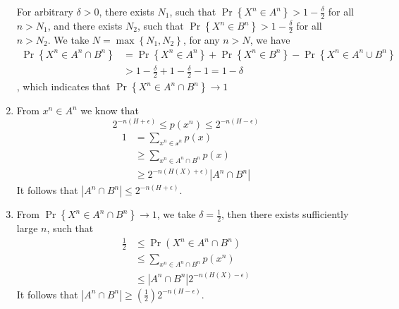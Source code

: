 \begin{exercise}[AEP]
\begin{solution}
\begin{enumerate}
{      For arbitrary $\delta > 0$, there exists $N_1$, such that  $\Pr \left\{X^n \in A^n \right\} > 1 - \frac{\delta}{2}$ for all $n>N_1$, and there exists $N_2$, such that  $\Pr \left\{X^n \in B^n \right\} > 1 - \frac{\delta}{2}$ for all $n>N_2$.
      We take $N = \max \left\{N_1,N_2\right\}$, for any $n>N$, we have
      \begin{equation}
        \begin{aligned}
          \Pr \left\{X^{n} \in A^{n} \cap B^{n}\right\} &= \Pr \left\{X^n \in A^n \right\} +  \Pr \left\{X^n \in B^n \right\} - \Pr \left\{X^n \in A^n \cup B^n \right\}\\
          & > 1 - \frac{\delta}{2} + 1 - \frac{\delta}{2} - 1 = 1 - \delta
        \end{aligned}
      \end{equation}
      , which indicates that $\Pr \left\{X^{n} \in A^{n} \cap B^{n}\right\} \rightarrow 1$
    }
    \item {
      From $x^n\in A^n$ we know that
      \begin{equation}
        2^{-n(H+\epsilon)} \le p(x^n) \le 2^{-n(H-\epsilon)}
      \end{equation}
      \begin{equation}
        \begin{aligned}
          1 &= \sum_{x^n\in \mathcal{x}^n} p(x) \\
          &\ge \sum_{x^n\in A^n \cap B^n} p(x) \\
          &\ge 2^{-n(H(X)+\epsilon)} |A^n\cap B^n|
        \end{aligned}
      \end{equation}
      It follows that $\left|A^{n} \cap B^{n}\right| \leq 2^{-n(H+\epsilon)}$.
    }
    \item {
      From $\Pr \left\{X^n \in A^n \cap B^n \right\} \rightarrow 1$, we take $\delta = \frac{1}{2}$, then there exists sufficiently large $n$, such that
      \begin{equation}
        \begin{aligned}
          \frac{1}{2} &\le \Pr (X^n \in A^n \cap B^n) \\
          &\le \sum_{x^n \in A^n \cap B^n} p(x^n) \\
          &\le |A^n\cap B^n| 2^{-n(H(X)-\epsilon)}
        \end{aligned}
      \end{equation}
      It follows that $\left|A^{n} \cap B^{n}\right| \geq \left( \frac{1}{2}\right) 2^{-n(H-\epsilon)}$.
    }
  \end{enumerate}
  \end{solution}
  \label{ex4-7}
\end{exercise}

